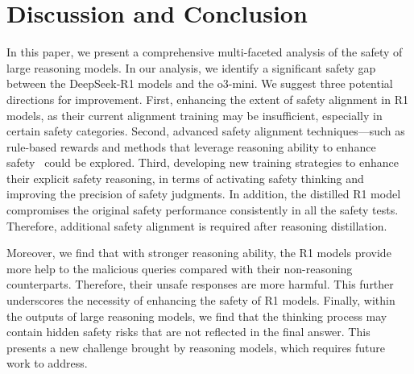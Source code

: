 \section{Discussion and Conclusion}
\vspace{-0.27cm}
In this paper, we present a comprehensive multi-faceted analysis of the safety of large reasoning models.  
In our analysis, we identify a significant safety gap between the DeepSeek-R1 models and the o3-mini. 
We suggest three potential directions for improvement. First, enhancing the extent of safety alignment in R1 models, as their current alignment training may be insufficient, especially in certain safety categories. 
Second, advanced safety alignment techniques—such as rule-based rewards and methods that leverage reasoning ability to enhance safety~\cite{mu2024rule,guan2412deliberative} could be explored.
Third, developing new training strategies to enhance their explicit safety reasoning, in terms of activating safety thinking and improving the precision of safety judgments.
In addition, the distilled R1 model compromises the original safety performance consistently in all the safety tests. Therefore, additional safety alignment is required after reasoning distillation. 

Moreover, we find that with stronger reasoning ability, the R1 models provide more help to the malicious queries compared with their non-reasoning counterparts.  Therefore,  their unsafe responses are more harmful.
This further underscores the necessity of enhancing the safety of R1 models.
Finally, within the outputs of large reasoning models, we find that the thinking process may contain hidden safety risks that are not reflected in the final answer. This presents a new challenge brought by reasoning models, which requires future work to address.


